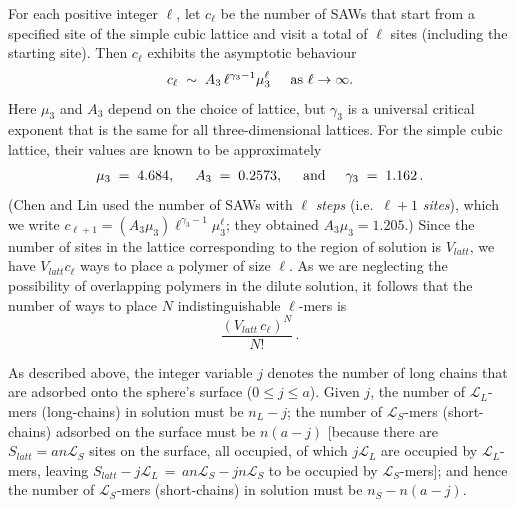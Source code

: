 \documentclass[twoside,twocolumn,9pt]{article}
\newcommand{\leng}{\mathcal{L}}
\begin{document}
For each positive integer $\ell$, let $c_{\ell}$ be
the number of SAWs that start from a specified site of the simple cubic lattice and visit a total of $\ell$ sites (including the starting site).
Then $c_{\ell}$ exhibits the asymptotic
behaviour\cite{Madras2013} 
\begin{equation}
    \label{eq.sawscale}
       c_{\ell}  \;\sim  \;  A_3 \, {\ell}^{\gamma_3-1}  \mu_3^{\ell}    \hspace{5mm}\hbox{as $\ell\rightarrow\infty$}.
\end{equation}
Here $\mu_3$ and $A_3$ depend on the choice of lattice, but $\gamma_3$ is a universal critical exponent
that is the same for all three-dimensional lattices.  
For the simple cubic lattice, 
their values are known to be approximately \cite{Chen2002,Madras2013}
\begin{equation}
   \label{eq.gammas}   \mu_3 \;=\;  4.684, \hspace{5mm}
        A_3 \;=\;  0.2573,    \hspace{5mm}\hbox{and}\hspace{5mm}
   \gamma_3 \;=\;  1.162 \,.  %
\end{equation}
(Chen and Lin\cite{Chen2002} used the 
number of SAWs with $\ell$ \textit{steps} (i.e.\ $\ell+1$ \textit{sites}), which we write  $c_{\ell+1}=(A_3\mu_3)\ell^{\gamma_3-1}\mu_3^{\ell}$; 
they obtained $A_3\mu_3=1.205$.)
Since the number of sites in the lattice corresponding to the region of solution is $V_{latt}$, 
we have $V_{latt}c_{\ell}$ ways to place a polymer of size ${\ell}$.  As we are neglecting the
possibility of overlapping polymers in the dilute solution, it follows that the number of ways to 
place $N$ indistinguishable $\ell$-mers is 
\begin{equation}
  \label{eq.Npoly}
   \frac{(V_{latt}\,c_{\ell})^N}{N!}  \,.   
\end{equation}

 As described above, the integer variable $j$ 
 denotes the number of long chains that are adsorbed
 onto the sphere's surface ($0\leq j\leq a$).
 Given $j$, the number of $\leng_L$-mers (long-chains) in solution must be $n_L-j$; 
 the number of $\leng_S$-mers (short-chains) adsorbed on the surface must be $n(a-j)$ [because there are $S_{latt}=an\leng_S$ sites on the surface, all occupied, of which $j\leng_L$ are occupied by $\leng_L$-mers, leaving $S_{latt}-j\leng_L\,=\, an\leng_S-jn\leng_S$ to be  occupied by $\leng_S$-mers]; 
 and hence the number of $\leng_S$-mers (short-chains) in solution must be  $n_S-n(a-j)$.
\end{document}
